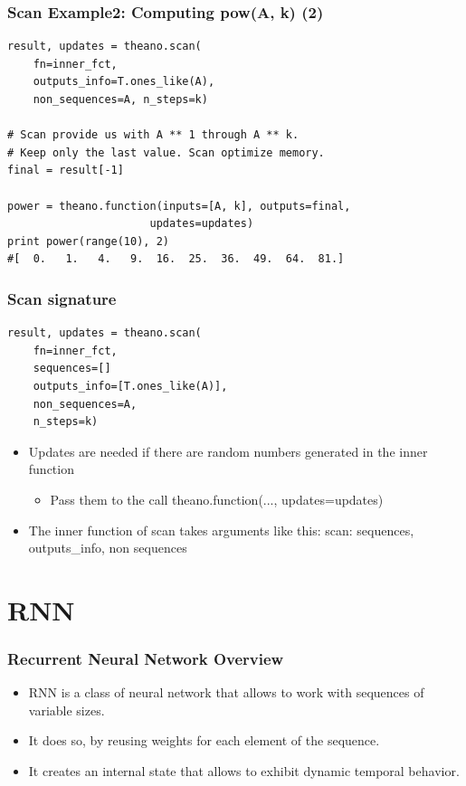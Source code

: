 \documentclass[utf8x,xcolor=pdftex,dvipsnames,table]{beamer}
\begin{document}
\begin{frame}[fragile]
  \frametitle{Scan Example2: Computing pow(A, k) (2)}

\begin{lstlisting}
result, updates = theano.scan(
    fn=inner_fct,
    outputs_info=T.ones_like(A),
    non_sequences=A, n_steps=k)

# Scan provide us with A ** 1 through A ** k.
# Keep only the last value. Scan optimize memory.
final = result[-1]

power = theano.function(inputs=[A, k], outputs=final,
                      updates=updates)
print power(range(10), 2)
#[  0.   1.   4.   9.  16.  25.  36.  49.  64.  81.]
\end{lstlisting}
\end{frame}

\begin{frame}[fragile]
  \frametitle{Scan signature}

\begin{lstlisting}
result, updates = theano.scan(
    fn=inner_fct,
    sequences=[]
    outputs_info=[T.ones_like(A)],
    non_sequences=A,
    n_steps=k)
\end{lstlisting}

\begin{itemize}
\item Updates are needed if there are random numbers generated in the inner function
\begin{itemize}
\item Pass them to the call theano.function(..., updates=updates)
\end{itemize}
\item The inner function of scan takes arguments like this:
   scan: sequences, outputs\_info, non sequences
\end{itemize}

\end{frame}


\section{RNN}
\begin{frame}
  \tableofcontents[currentsection]
\end{frame}

\begin{frame}
  \frametitle{Recurrent Neural Network Overview}
\begin{itemize}
\item RNN is a class of neural network that allows to work with sequences of variable sizes.
\item It does so, by reusing weights for each element of the sequence.
\item It creates an internal state that allows to exhibit dynamic temporal behavior.
\end{itemize}
\end{frame}
\end{document}
